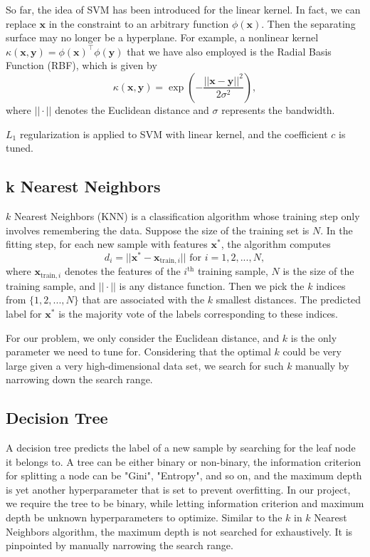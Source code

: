 \documentclass[10pt,twocolumn,letterpaper]{article}
\begin{document}
	So far, the idea of SVM has been introduced for the linear kernel. In fact, we can replace $\bm{x}$ in the constraint to an arbitrary function $\phi(\bm{x})$. Then the separating surface may no longer be a hyperplane. For example, a nonlinear kernel $\kappa(\bm{x},\bm{y}) = \phi(\bm{x})^\top \phi(\bm{y})$ that we have also employed is the Radial Basis Function (RBF), which is given by $$\kappa(\bm{x},\bm{y}) = \exp\left(-\frac{||\bm{x}-\bm{y}||^2}{2\sigma^2}\right),$$ where $||\cdot||$ denotes the Euclidean distance and $\sigma$ represents the bandwidth.  
	
	$L_1$ regularization is applied to SVM with linear kernel, and the coefficient $c$ is tuned. 
	\subsection{k Nearest Neighbors}
	$k$ Nearest Neighbors (KNN) is a classification algorithm whose training step only involves remembering the data. Suppose the size of the training set is $N$. In the fitting step, for each new sample with features $\bm{x}^*$, the algorithm computes $$d_i = ||\bm{x}^* - \bm{x}_{\text{train},i}|| \text{ for } i = 1,2,...,N,$$ where $\bm{x}_{\text{train},i}$ denotes the features of the $i^\text{th}$ training sample, $N$ is the size of the training sample, and $||\cdot||$ is any distance function. Then we pick the $k$ indices from $\{1,2,...,N\}$ that are associated with the $k$ smallest distances. The predicted label for $\bm{x}^*$ is the majority vote of the labels corresponding to these indices. 
	
	For our problem, we only consider the Euclidean distance, and $k$ is the only parameter we need to tune for. Considering that the optimal $k$ could be very large given a very high-dimensional data set, we search for such $k$ manually by narrowing down the search range.
	\subsection{Decision Tree}
	A decision tree predicts the label of a new sample by searching for the leaf node it belongs to. A tree can be either binary or non-binary, the information criterion for splitting a node can be "Gini", "Entropy", and so on, and the maximum depth is yet another hyperparameter that is set to prevent overfitting. In our project, we require the tree to be binary, while letting information criterion and maximum depth be unknown hyperparameters to optimize. Similar to the $k$ in $k$ Nearest Neighbors algorithm, the maximum depth is not searched for exhaustively. It is pinpointed by manually narrowing the search range.
\end{document}
